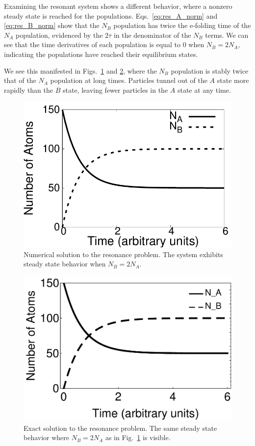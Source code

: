\documentclass[pra,twocolumn,showpacs,amsmath,amssymb]{revtex4-1}
\begin{document}
Examining the resonant system shows a different behavior, where a nonzero
steady state is reached for the populations. Eqs.~\ref{eq:res_A_norm} and
\ref{eq:res_B_norm} show that the $N_B$ population has twice the e-folding time of
the $N_A$ population, evidenced by the $2 \tau$ in the denominator of the $N_B$
terms. We can see that the time derivatives of each population is equal to 0
when $N_B = 2 N_A$, indicating the populations have reached their equilibrium
states.

We see this manifested in Figs.~\ref{fig:resonance} and \ref{fig:analyt_resonance},
where the $N_B$ population is stably twice that of the $N_A$ population at long times.
Particles tunnel out of the $A$ state more rapidly than the $B$ state, leaving
fewer particles in the $A$ state at any time.

\begin{figure}

  \includegraphics[width=.8\linewidth]{resonance.pdf}
  \caption{Numerical solution to the resonance problem. The system exhibits steady
  state behavior when $N_B = 2 N_A$.}
  \label{fig:resonance}
\end{figure}
\begin{figure}

  \includegraphics[width=.8\linewidth]{analyt_res.pdf}
  \caption{Exact solution to the resonance problem. The same steady
  state behavior where $N_B = 2 N_A$ as in Fig.~\ref{fig:resonance} is visible.}
  \label{fig:analyt_resonance}
\end{figure}
\end{document}
